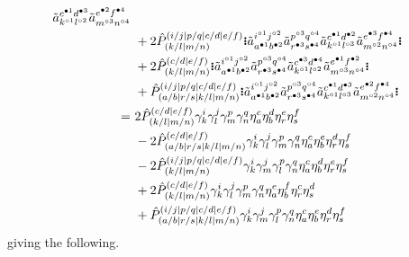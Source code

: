 \documentclass[11pt,fleqn]{article}
\newcommand{\g}{\gamma}      %
\newcommand{\h}{\eta}        %
\newcommand{\tl}{\ensuremath{\tilde}}
\newcommand{\op}[1]{\ensuremath{\hat{#1}}}
\newcommand{\GNO}[1]{\setstackgap{S}{0.7pt}\ensuremath{\Shortstack{\textbf{.} \textbf{.} \textbf{.}}#1\Shortstack{\textbf{.} \textbf{.} \textbf{.}}}}
\theoremstyle{mystyle}
\newcommand{\hole}{\circ}
\newcommand{\ptcl}{\bullet}
\begin{document}
\begin{align*}
{    \tl{a}_{k^{\hole1}l^{\hole2}}^{c^{\ptcl1}d^{\ptcl3}}
    \tl{a}_{m^{\hole3}n^{\hole4}}^{e^{\ptcl2}f^{\ptcl4}}
  }
\\&\
+
  2
  \op{P}_{(k/l|m/n)}^{(i/j|p/q|c/d|e/f)}
  \GNO{
    \tl{a}_{a^{\ptcl1}b^{\ptcl2}}^{i^{\hole1}j^{\hole2}}
    \tl{a}_{r^{\ptcl3}s^{\ptcl4}}^{p^{\hole3}q^{\hole4}}
    \tl{a}_{k^{\hole1}l^{\hole3}}^{c^{\ptcl1}d^{\ptcl2}}
    \tl{a}_{m^{\hole2}n^{\hole4}}^{e^{\ptcl3}f^{\ptcl4}}
  }
\\&\
+
  2
  \op{P}_{(k/l|m/n)}^{(c/d|e/f)}
  \GNO{
    \tl{a}_{a^{\ptcl1}b^{\ptcl2}}^{i^{\hole1}j^{\hole2}}
    \tl{a}_{r^{\ptcl3}s^{\ptcl4}}^{p^{\hole3}q^{\hole4}}
    \tl{a}_{k^{\hole1}l^{\hole2}}^{c^{\ptcl3}d^{\ptcl4}}
    \tl{a}_{m^{\hole3}n^{\hole4}}^{e^{\ptcl1}f^{\ptcl2}}
  }
\\&\
+
  \op{P}_{(a/b|r/s|k/l|m/n)}^{(i/j|p/q|c/d|e/f)}
  \GNO{
    \tl{a}_{a^{\ptcl1}b^{\ptcl2}}^{i^{\hole1}j^{\hole2}}
    \tl{a}_{r^{\ptcl3}s^{\ptcl4}}^{p^{\hole3}q^{\hole4}}
    \tl{a}_{k^{\hole1}l^{\hole3}}^{c^{\ptcl1}d^{\ptcl3}}
    \tl{a}_{m^{\hole2}n^{\hole4}}^{e^{\ptcl2}f^{\ptcl4}}
  }
\\=&\
  2
  \op{P}_{(k/l|m/n)}^{(c/d|e/f)}
  \g_k^i\g_l^j\g_m^p\g_n^q
  \h_a^c\h_b^d\h_r^e\h_s^f
\\&\
-
  2
  \op{P}_{(a/b|r/s|k/l|m/n)}^{(c/d|e/f)}
  \g_k^i\g_l^j\g_m^p\g_n^q
  \h_a^c\h_b^e\h_r^d\h_s^f
\\&\
-
  2
  \op{P}_{(k/l|m/n)}^{(i/j|p/q|c/d|e/f)}
  \g_k^i\g_m^j\g_l^p\g_n^q
  \h_a^c\h_b^d\h_r^e\h_s^f
\\&\
+
  2
  \op{P}_{(k/l|m/n)}^{(c/d|e/f)}
  \g_k^i\g_l^j\g_m^p\g_n^q
  \h_a^e\h_b^f\h_r^c\h_s^d
\\&\
+
  \op{P}_{(a/b|r/s|k/l|m/n)}^{(i/j|p/q|c/d|e/f)}
  \g_k^i\g_m^j\g_l^p\g_n^q
  \h_a^c\h_b^e\h_r^d\h_s^f
\end{align*}
giving the following.
\end{document}
